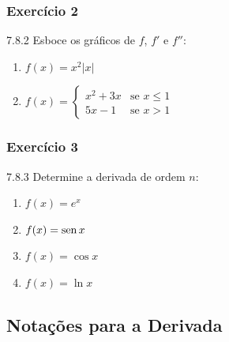 \subsubsection*{Exercício 2}
\begin{exercicio}[2]{7.8.2}
Esboce os gráficos de $f$, $f'$ e $f''$:
\begin{enumerate}[label=\alph*)]
    \item $f(x) = x^2 |x|$
    \item $f(x) = \begin{cases} x^2 + 3x & \text{se } x \le 1 \\ 5x - 1 & \text{se } x > 1 \end{cases}$
\end{enumerate}
\end{exercicio}

\subsubsection*{Exercício 3}
\begin{exercicio}[3]{7.8.3}
Determine a derivada de ordem $n$:
\begin{enumerate}[label=\alph*)]
    \item $f(x) = e^x$
    \item $f(x) = \operatorname{sen} x$
    \item $f(x) = \cos x$
    \item $f(x) = \ln x$
\end{enumerate}
\end{exercicio}

\clearpage

\subsection{Notações para a Derivada}

